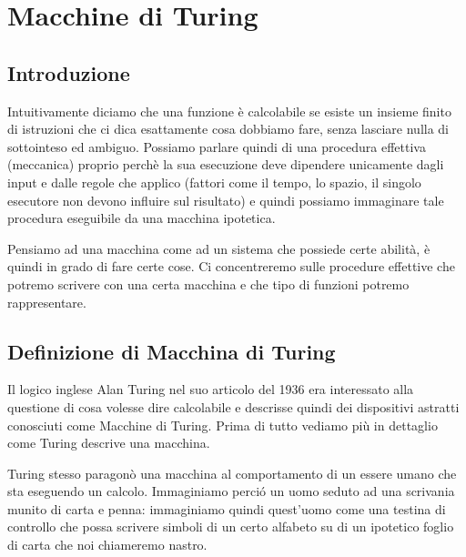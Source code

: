 \newcommand{\bew}{\mathsf{Bew}}
\newcommand{\eq}[1]{\begin{equation} #1 \end{equation}}
\newcommand{\gdnum}[1]{\ulcorner #1 \urcorner}
\newcommand{\eqconnome}[2]{\begin{equation} \label{eq:#2} #1 \end{equation}}

\chapter{Macchine di Turing}

\section{Introduzione}
Intuitivamente diciamo che una funzione \`e calcolabile se esiste un insieme
finito di istruzioni che ci dica esattamente cosa dobbiamo fare, senza lasciare
nulla di sottointeso ed ambiguo. Possiamo parlare quindi di una procedura
effettiva (meccanica) proprio perch\`e la sua esecuzione deve dipendere
unicamente dagli input e dalle regole che applico (fattori come il tempo, lo
spazio, il singolo esecutore non devono influire sul risultato) e quindi
possiamo immaginare tale procedura eseguibile da una macchina ipotetica.

Pensiamo ad una macchina come ad un sistema che possiede certe abilit\`a, \`e
quindi in grado di fare certe cose. Ci concentreremo sulle procedure effettive
che potremo scrivere con una certa macchina e che tipo di funzioni potremo
rappresentare.

\section{Definizione di Macchina di Turing}
Il logico inglese Alan Turing nel suo articolo del 1936 era interessato alla
questione di cosa volesse dire calcolabile e descrisse quindi dei dispositivi
astratti conosciuti come Macchine di Turing. Prima di tutto vediamo pi\`u in
dettaglio come Turing descrive una macchina.

Turing stesso paragon\`o una macchina al comportamento di un essere umano che
sta eseguendo un calcolo. Immaginiamo perci\'o un uomo seduto ad una scrivania
munito di carta e penna: immaginiamo quindi quest'uomo come una testina di
controllo che possa scrivere simboli di un certo alfabeto su di un ipotetico
foglio di carta che noi chiameremo nastro.


